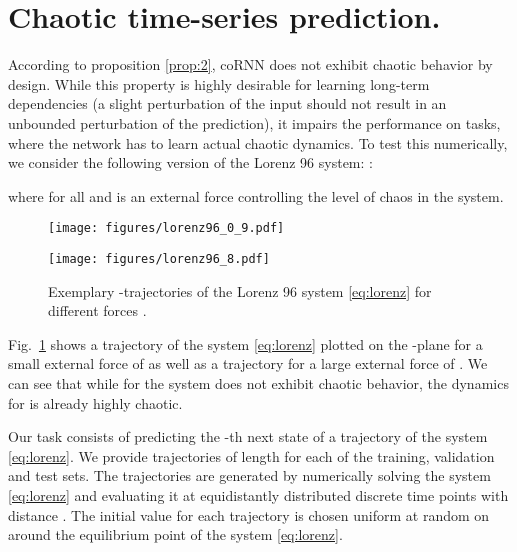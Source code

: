 \documentclass{article} \usepackage{iclr2021_conference,times}
\newcommand{\fref}[1] {Fig.~\ref{#1}}
\begin{document}
\section{Chaotic time-series prediction.}
\label{sec:ctsp}
According to proposition \ref{prop:2}, coRNN does not exhibit chaotic behavior by design. While this property is highly desirable for learning long-term dependencies (a slight perturbation of the input should not result in an unbounded perturbation of the prediction), it impairs the performance on tasks, where the network has to learn actual chaotic dynamics. To test this numerically, we consider the following version of the Lorenz 96 system: \citep{lorenz96}:

where  for all  and  is an external force controlling the level of chaos in the system.
\begin{figure}[ht!]
\centering
\begin{minipage}[t]{0.49\textwidth}	
\texttt{[image: figures/lorenz96\_0\_9.pdf]}
\end{minipage}\hspace{0.01\textwidth}
\begin{minipage}[t]{.49\textwidth}
\texttt{[image: figures/lorenz96\_8.pdf]}
\end{minipage}
\caption{Exemplary -trajectories of the Lorenz 96 system \eqref{eq:lorenz} for different forces .}
\label{fig:lorenz}
\end{figure}
\fref{fig:lorenz} shows a trajectory of the system \eqref{eq:lorenz} plotted on the -plane for a small external force of  as well as a trajectory for a large external force of . We can see that while for  the system does not exhibit chaotic behavior, the dynamics for  is already highly chaotic.

Our task consists of predicting the -th next state of a trajectory of the system \eqref{eq:lorenz}. 
We provide  trajectories of length  for each of the training, validation and test sets. The trajectories are generated by numerically solving the system \eqref{eq:lorenz} and evaluating it at  equidistantly distributed discrete time points with distance . The initial value for each trajectory is chosen uniform at random on  around the equilibrium point  of the system \eqref{eq:lorenz}. 
\end{document}
